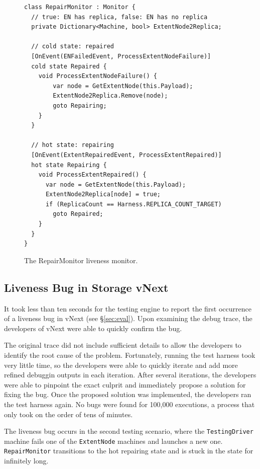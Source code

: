\begin{figure}[t]
\begin{lstlisting}
class RepairMonitor : Monitor {
  // true: EN has replica, false: EN has no replica
  private Dictionary<Machine, bool> ExtentNode2Replica;

  // cold state: repaired
  [OnEvent(ENFailedEvent, ProcessExtentNodeFailure)]
  cold state Repaired {
    void ProcessExtentNodeFailure() {
        var node = GetExtentNode(this.Payload);
        ExtentNode2Replica.Remove(node);
        goto Repairing;
    }
  }

  // hot state: repairing
  [OnEvent(ExtentRepairedEvent, ProcessExtentRepaired)]
  hot state Repairing {
    void ProcessExtentRepaired() {
      var node = GetExtentNode(this.Payload);
      ExtentNode2Replica[node] = true;
      if (ReplicaCount == Harness.REPLICA_COUNT_TARGET)
        goto Repaired;
    }
  }
}
\end{lstlisting}
\vspace{-4mm}
\caption{The RepairMonitor liveness monitor.}
\label{fig:monitor}
\vspace{-2mm}
\end{figure}

\subsection{Liveness Bug in \Azure Storage vNext}
\label{sec:method:azurestore}

It took less than ten seconds for the \psharp testing engine to report the first occurrence of a liveness bug in vNext (see \S\ref{sec:eval}). Upon examining the debug trace, the developers of vNext were able to quickly confirm the bug.

The original \psharp trace did not include sufficient details to allow the developers to identify the root cause of the problem. Fortunately, running the test harness took very little time, so the developers were able to quickly iterate and add more refined debuggin outputs in each iteration. After several iterations, the developers were able to pinpoint the exact culprit and immediately propose a solution for fixing the bug. Once the proposed solution was implemented, the developers ran the test harness again. No bugs were found for 100,000 executions, a process that only took on the order of tens of minutes.

The liveness bug occurs in the second testing scenario, where the \texttt{TestingDriver} machine fails one of the \texttt{ExtentNode} machines and launches a new one. \texttt{RepairMonitor} transitions to the hot repairing state and is stuck in the state for infinitely long.

